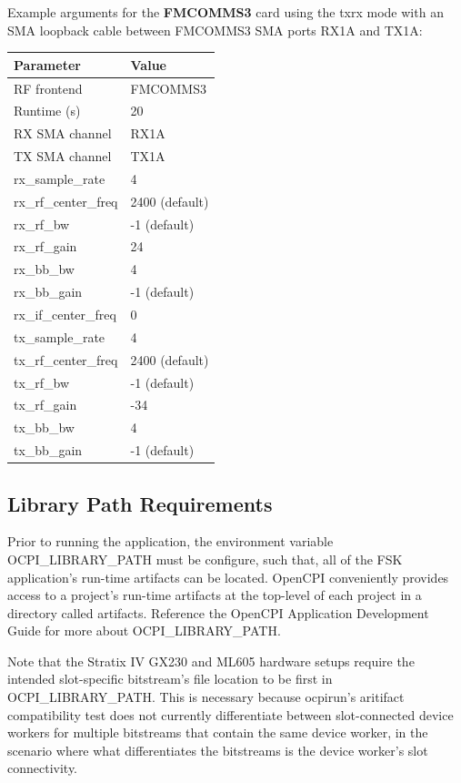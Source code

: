 \pagebreak
\noindent Example arguments for the \textbf{FMCOMMS3} card using the txrx mode with an SMA loopback cable between FMCOMMS3 SMA ports RX1A and TX1A:\\
\begin{tabular}{|l|l|}
\hline
\rowcolor{blue}
Parameter 	&        Value  	\\
\hline
RF frontend 	&        FMCOMMS3             	\\
\hline
Runtime (s) 	&        20 	        \\
\hline
RX SMA channel 	&        RX1A              	\\
\hline
TX SMA channel 	&        TX1A           	\\
\hline
rx\_sample\_rate 	&4 	                \\
\hline
rx\_rf\_center\_freq 	&2400 (default)  	\\
\hline
rx\_rf\_bw 	&        -1 (default)   \\
\hline
rx\_rf\_gain 	&        24       	\\
\hline
rx\_bb\_bw 	&        4 	        \\
\hline
rx\_bb\_gain 	&        -1 (default) 	\\
\hline
rx\_if\_center\_freq 	&0              	\\
\hline
tx\_sample\_rate 	&4              	\\
\hline
tx\_rf\_center\_freq 	&2400 (default)\\
\hline
tx\_rf\_bw 	&        -1 (default)   \\
\hline
tx\_rf\_gain 	&        -34 	        \\
\hline
tx\_bb\_bw 	&        4        	\\
\hline
tx\_bb\_gain    &       -1 (default) \\
\hline
\end{tabular}\par\medskip

\pagebreak
\subsection{Library Path Requirements}
\noindent Prior to running the application, the environment variable OCPI\_LIBRARY\_PATH must be configure, such that, all of the FSK application's run-time artifacts can be located. OpenCPI conveniently provides access to a project's run-time artifacts at the top-level of each project in a directory called artifacts. Reference the OpenCPI Application Development Guide for more about OCPI\_LIBRARY\_PATH. \par\medskip
\noindent Note that the Stratix IV GX230 and ML605 hardware setups require the intended slot-specific bitstream's file location to be first in OCPI\_LIBRARY\_PATH. This is necessary because ocpirun's aritifact compatibility test does not currently differentiate between slot-connected device workers for multiple bitstreams that contain the same device worker, in the scenario where what differentiates the bitstreams is the device worker's slot connectivity. \par\medskip

